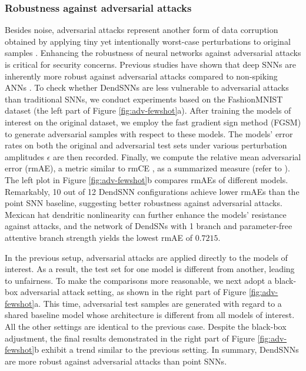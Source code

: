 \subsubsection*{Robustness against adversarial attacks}

Besides noise, adversarial attacks represent another form of data corruption obtained by applying tiny yet intentionally worst-case perturbations to original samples \cite{goodfellow2014explaining}. Enhancing the robustness of neural networks against adversarial attacks is critical for security concerns. Previous studies have shown that deep SNNs are inherently more robust against adversarial attacks compared to non-spiking ANNs \cite{sharmin2019comprehensive,sharmin2020adversarial}. To check whether DendSNNs are less vulnerable to adversarial attacks than traditional SNNs, we conduct experiments based on the FashionMNIST dataset (the left part of Figure \ref{fig:adv-fewshot}a). After training the models of interest on the original dataset, we employ the fast gradient sign method (FGSM) \cite{goodfellow2014explaining} to generate adversarial samples with respect to these models. The models' error rates on both the original and adversarial test sets under various perturbation amplitudes $\epsilon$ are then recorded. Finally, we compute the relative mean adversarial error (rmAE), a metric similar to rmCE \cite{hendrycks2019benchmarking}, as a summarized measure (refer to ). The left plot in Figure \ref{fig:adv-fewshot}b compares rmAEs of different models. Remarkably, 10 out of 12 DendSNN configurations achieve lower rmAEs than the point SNN baseline, suggesting better robustness against adversarial attacks. Mexican hat dendritic nonlinearity can further enhance the models' resistance against attacks, and the network of DendSNs with 1 branch and parameter-free attentive branch strength yields the lowest rmAE of $0.7215$.

In the previous setup, adversarial attacks are applied directly to the models of interest. As a result, the test set for one model is different from another, leading to unfairness. To make the comparisons more reasonable, we next adopt a black-box adversarial attack setting, as shown in the right part of Figure \ref{fig:adv-fewshot}a. This time, adversarial test samples are generated with regard to a shared baseline model whose architecture is different from all models of interest. All the other settings are identical to the previous case. Despite the black-box adjustment, the final results demonstrated in the right part of Figure \ref{fig:adv-fewshot}b exhibit a trend similar to the previous setting. In summary, DendSNNs are more robust against adversarial attacks than point SNNs.

